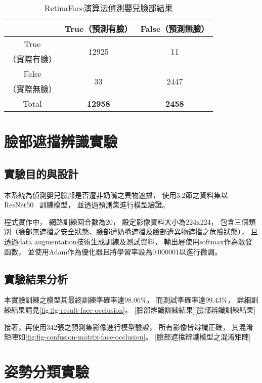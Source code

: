 \documentclass[class=NCU_thesis, crop=false]{standalone}
\begin{document}
\begin{table}[h]
    \centering
    \caption{RetinaFace演算法偵測嬰兒臉部結果}
    \label{table:table-retinaface}
    \begin{tabular}{ccc}
    \hline
     & True（預測有臉）& False（預測無臉）\\
    \hline
    True & \multirow{2}{*}{12925} & \multirow{2}{*}{11} \\
    （實際有臉）& & \\
    False & \multirow{2}{*}{33} & \multirow{2}{*}{2447} \\
    （實際無臉）&  & \\
    \hline
    Total & \textbf{12958} & \textbf{2458} \\
    \hline
    \end{tabular}
\end{table}

\section{臉部遮擋辨識實驗}
\subsection{實驗目的與設計}
本系統為偵測嬰兒臉部是否遭非奶嘴之異物遮擋，
使用3.2節之資料集以ResNet50~\cite{he_deep_2016}
訓練模型，
並透過預測集進行模型驗證。

程式實作中，
網路訓練回合數為20，
設定影像資料大小為224x224，
包含三個類別（臉部無遮擋之安全狀態、臉部遭奶嘴遮擋及臉部遭異物遮擋之危險狀態），
且透過data augmentation技術生成訓練及測試資料，
輸出層使用softmax作為激發函數，
並使用Adam作為優化器且將學習率設為0.000001以進行微調。

\subsection{實驗結果分析}
本實驗訓練之模型其最終訓練準確率達98.06\%，
而測試準確率達99.43\%，
詳細訓練結果請見\cref{fig:fig-result-face-occlusion}。
[臉部辨識訓練結果][臉部辨識訓練結果]

接著，再使用342張之預測集影像進行模型驗證，
所有影像皆辨識正確，
其混淆矩陣如\cref{fig:fig-confusion-matrix-face-occlusion}。
[臉部遮擋辨識模型之混淆矩陣]

\section{姿勢分類實驗}
\end{document}
